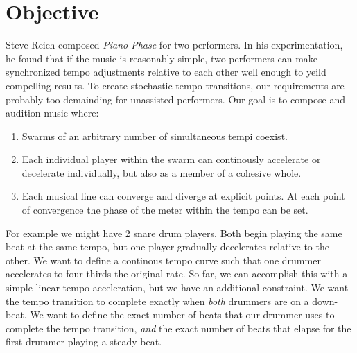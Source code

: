 \section{Objective}
\label{sec:polytempic-objective}
Steve Reich composed \textit{Piano Phase} for two performers. In his
experimentation, he found that if the music is reasonably simple, two
performers can make synchronized tempo adjustments relative to each
other well enough to yeild compelling results. To create stochastic
tempo transitions, our requirements are probably too demainding for
unassisted performers. Our goal is to compose and audition music
where:
\begin{enumerate}
  \item Swarms of an arbitrary number of simultaneous tempi
    coexist. 
  \item Each individual player within the swarm can continously
    accelerate or decelerate individually, but also as a member of a
    cohesive whole. 
  \item Each musical line can converge and diverge at explicit
    points. At each point of convergence the phase of the meter within
    the tempo can be set.
\end{enumerate}
For example we might have 2 snare drum players. Both begin playing the
same beat at the same tempo, but one player gradually decelerates
relative to the other. We want to define a continous tempo curve such
that one drummer accelerates to four-thirds the original rate. So far,
we can accomplish this with a simple linear tempo acceleration, but we
have an additional constraint. We want the tempo transition to
complete exactly when \emph{both} drummers are on a down-beat. We want
to define the exact number of beats that our drummer uses to complete
the tempo transition, \emph{and} the exact number of beats that elapse
for the first drummer playing a steady beat.

